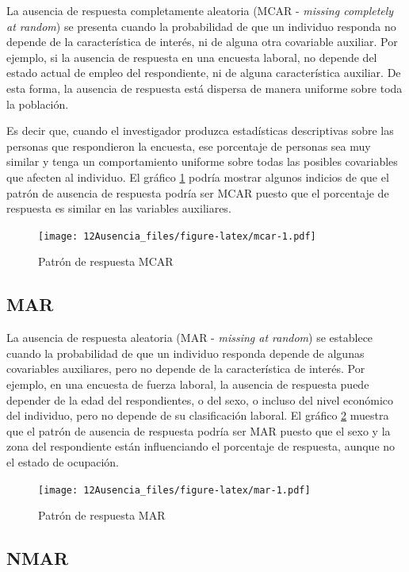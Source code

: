 \documentclass[
  12pt,
]{book}
\begin{document}
La ausencia de respuesta completamente aleatoria (MCAR - \emph{missing completely at random}) se presenta cuando la probabilidad de que un individuo responda no depende de la característica de interés, ni de alguna otra covariable auxiliar. Por ejemplo, si la ausencia de respuesta en una encuesta laboral, no depende del estado actual de empleo del respondiente, ni de alguna característica auxiliar. De esta forma, la ausencia de respuesta está dispersa de manera uniforme sobre toda la población.

Es decir que, cuando el investigador produzca estadísticas descriptivas sobre las personas que respondieron la encuesta, ese porcentaje de personas sea muy similar y tenga un comportamiento uniforme sobre todas las posibles covariables que afecten al individuo. El gráfico \ref{fig:mcar} podría mostrar algunos indicios de que el patrón de ausencia de respuesta podría ser MCAR puesto que el porcentaje de respuesta es similar en las variables auxiliares.

\begin{figure}
\centering
\texttt{[image: 12Ausencia\_files/figure-latex/mcar-1.pdf]}
\caption{\label{fig:mcar}Patrón de respuesta MCAR}
\end{figure}

\hypertarget{mar}{%
\subsection{MAR}\label{mar}}

La ausencia de respuesta aleatoria (MAR - \emph{missing at random}) se establece cuando la probabilidad de que un individuo responda depende de algunas covariables auxiliares, pero no depende de la característica de interés. Por ejemplo, en una encuesta de fuerza laboral, la ausencia de respuesta puede depender de la edad del respondientes, o del sexo, o incluso del nivel económico del individuo, pero no depende de su clasificación laboral. El gráfico \ref{fig:mar} muestra que el patrón de ausencia de respuesta podría ser MAR puesto que el sexo y la zona del respondiente están influenciando el porcentaje de respuesta, aunque no el estado de ocupación.

\begin{figure}
\centering
\texttt{[image: 12Ausencia\_files/figure-latex/mar-1.pdf]}
\caption{\label{fig:mar}Patrón de respuesta MAR}
\end{figure}

\hypertarget{nmar}{%
\subsection{NMAR}\label{nmar}}
\end{document}
